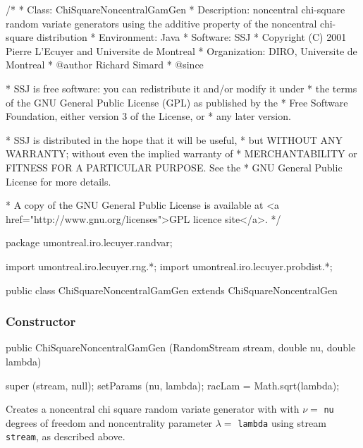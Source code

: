 \begin{code}
\begin{hide}
/*
 * Class:        ChiSquareNoncentralGamGen
 * Description:  noncentral chi-square random variate generators using the
                 additive property of the noncentral chi-square distribution
 * Environment:  Java
 * Software:     SSJ
 * Copyright (C) 2001  Pierre L'Ecuyer and Universite de Montreal
 * Organization: DIRO, Universite de Montreal
 * @author       Richard Simard
 * @since

 * SSJ is free software: you can redistribute it and/or modify it under
 * the terms of the GNU General Public License (GPL) as published by the
 * Free Software Foundation, either version 3 of the License, or
 * any later version.

 * SSJ is distributed in the hope that it will be useful,
 * but WITHOUT ANY WARRANTY; without even the implied warranty of
 * MERCHANTABILITY or FITNESS FOR A PARTICULAR PURPOSE.  See the
 * GNU General Public License for more details.

 * A copy of the GNU General Public License is available at
   <a href="http://www.gnu.org/licenses">GPL licence site</a>.
 */
\end{hide}
package umontreal.iro.lecuyer.randvar;\begin{hide}
import umontreal.iro.lecuyer.rng.*;
import umontreal.iro.lecuyer.probdist.*;
\end{hide}

public class ChiSquareNoncentralGamGen extends ChiSquareNoncentralGen \begin{hide} {
   private double racLam = -1.0;

\end{hide}\end{code}

\subsubsection* {Constructor}

\begin{code}

   public ChiSquareNoncentralGamGen (RandomStream stream,
                                     double nu, double lambda) \begin{hide} {
      super (stream, null);
      setParams (nu, lambda);
      racLam = Math.sqrt(lambda);
   }\end{hide}
\end{code}
\begin{tabb}  Creates a noncentral chi square random variate generator with
 with $\nu = $ \texttt{nu} degrees of freedom and noncentrality parameter
$\lambda = $ \texttt{lambda} using stream \texttt{stream}, as described above.
\end{tabb}


